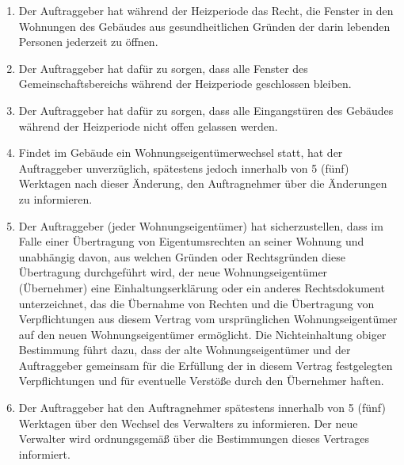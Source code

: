 \begin{multicols}{2}
\begin{enumerate}
   \item Der Auftraggeber hat während der Heizperiode das Recht, die Fenster in den Wohnungen des Gebäudes aus gesundheitlichen Gründen der darin lebenden Personen jederzeit zu öffnen.
   \item Der Auftraggeber hat dafür zu sorgen, dass alle Fenster des Gemeinschaftsbereichs während der Heizperiode geschlossen bleiben.
   \item Der Auftraggeber hat dafür zu sorgen, dass alle Eingangstüren des Gebäudes während der Heizperiode nicht offen gelassen werden.
   \item Findet im Gebäude ein Wohnungseigentümerwechsel statt, hat der Auftraggeber unverzüglich, spätestens jedoch innerhalb von 5 (fünf) Werktagen nach dieser Änderung, den Auftragnehmer über die Änderungen zu informieren.
   \item Der Auftraggeber (jeder Wohnungseigentümer) hat sicherzustellen, dass im Falle einer Übertragung von Eigentumsrechten an seiner Wohnung und unabhängig davon, aus welchen Gründen oder Rechtsgründen diese Übertragung durchgeführt wird, der neue Wohnungseigentümer (Übernehmer) eine Einhaltungserklärung oder ein anderes Rechtsdokument unterzeichnet, das die Übernahme von Rechten und die Übertragung von Verpflichtungen aus diesem Vertrag vom ursprünglichen Wohnungseigentümer auf den neuen Wohnungseigentümer ermöglicht. Die Nichteinhaltung obiger Bestimmung führt dazu, dass der alte Wohnungseigentümer und der Auftraggeber gemeinsam für die Erfüllung der in diesem Vertrag festgelegten Verpflichtungen und für eventuelle Verstöße durch den Übernehmer haften.
   \item Der Auftraggeber hat den Auftragnehmer spätestens innerhalb von 5 (fünf) Werktagen über den Wechsel des Verwalters zu informieren. Der neue Verwalter wird ordnungsgemäß über die Bestimmungen dieses Vertrages informiert.
  \end{enumerate}


\end{multicols}
